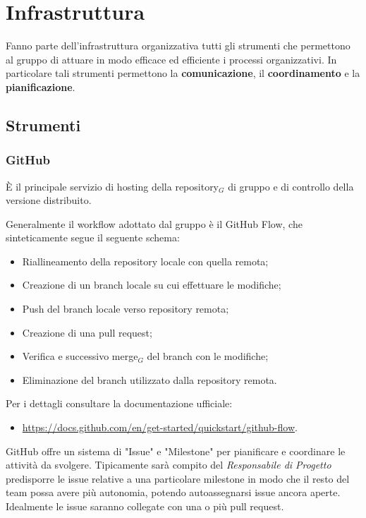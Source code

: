 \section{Infrastruttura}\label{sec:Infrastruttura}
Fanno parte dell'infrastruttura organizzativa tutti gli strumenti che permettono al gruppo di attuare in modo efficace ed efficiente i processi organizzativi. In particolare tali strumenti permettono la \textbf{comunicazione}, il \textbf{coordinamento} e la \textbf{pianificazione}.

\subsection{Strumenti}
\subsubsection{GitHub}
È il principale servizio di hosting della repository$_G$ di gruppo e di controllo della versione distribuito.

Generalmente il workflow adottato dal gruppo è il GitHub Flow, che sinteticamente segue il seguente schema:
\begin{itemize}
  \item Riallineamento della repository locale con quella remota;
  \item Creazione di un branch locale su cui effettuare le modifiche;
  \item Push del branch locale verso repository remota;
  \item Creazione di una pull request;
  \item Verifica e successivo merge$_G$ del branch con le modifiche;
  \item Eliminazione del branch utilizzato dalla repository remota.
\end{itemize}
Per i dettagli consultare la documentazione ufficiale:
\begin{itemize}
  \item \url{https://docs.github.com/en/get-started/quickstart/github-flow}.
\end{itemize}

GitHub offre un sistema di "Issue" e "Milestone" per pianificare e coordinare le attività da svolgere. Tipicamente sarà compito del \textit{Responsabile di Progetto} predisporre le issue relative a una particolare milestone in modo che il resto del team possa avere più autonomia, potendo autoassegnarsi issue ancora aperte. Idealmente le issue saranno collegate con una o più pull request.

